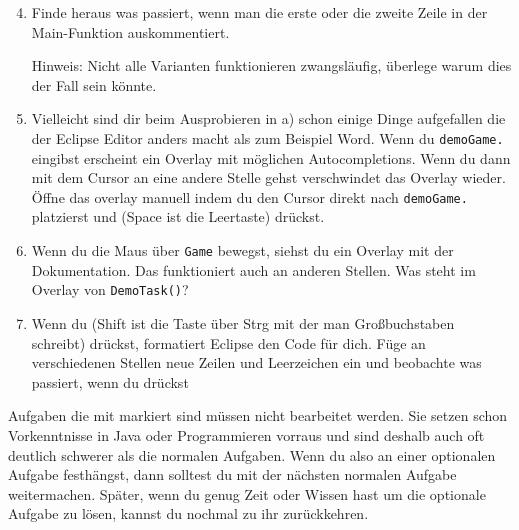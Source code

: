 \begin{enumerate} \setcounter{enumi}{3}
    \item Finde heraus was passiert, wenn man die erste oder die zweite Zeile in der Main-Funktion auskommentiert.
    
        Hinweis: Nicht alle Varianten funktionieren zwangsläufig, überlege warum dies der Fall sein könnte.
    \item Vielleicht sind dir beim Ausprobieren in a) schon einige Dinge aufgefallen die der Eclipse Editor anders macht als zum Beispiel Word.
        Wenn du \lstinline{demoGame.} eingibst erscheint ein Overlay mit möglichen Autocompletions.
        Wenn du dann mit dem Cursor an eine andere Stelle gehst verschwindet das Overlay wieder.
        Öffne das overlay manuell indem du den Cursor direkt nach \lstinline{demoGame.} platzierst und  (Space ist die Leertaste) drückst.
    \item
        Wenn du die Maus über \lstinline{Game} bewegst, siehst du ein Overlay mit der Dokumentation.
        Das funktioniert auch an anderen Stellen.
        Was steht im Overlay von \lstinline{DemoTask()}?
    \item
        Wenn du  (Shift ist die Taste über Strg mit der man Großbuchstaben schreibt) drückst, formatiert Eclipse den Code für dich.
        Füge an verschiedenen Stellen neue Zeilen und Leerzeichen ein und beobachte was passiert, wenn du  drückst
\end{enumerate}


\begin{Infobox} 
    Aufgaben die mit \optional markiert sind müssen nicht bearbeitet werden.
    Sie setzen schon Vorkenntnisse in Java oder Programmieren vorraus und sind deshalb auch oft deutlich schwerer als die normalen Aufgaben.
    Wenn du also an einer optionalen Aufgabe festhängst, dann solltest du mit der nächsten normalen Aufgabe weitermachen.
    Später, wenn du genug Zeit oder Wissen hast um die optionale Aufgabe zu lösen, kannst du nochmal zu ihr zurückkehren.
\end{Infobox}


